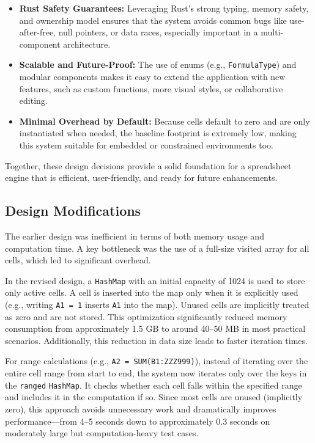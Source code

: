 \documentclass{article}
\begin{document}
\begin{itemize}
    \item \textbf{Rust Safety Guarantees:} Leveraging Rust’s strong typing, memory safety, and ownership model ensures that the system avoids common bugs like use-after-free, null pointers, or data races, especially important in a multi-component architecture.

    \item \textbf{Scalable and Future-Proof:} The use of enums (e.g., \texttt{FormulaType}) and modular components makes it easy to extend the application with new features, such as custom functions, more visual styles, or collaborative editing.

    \item \textbf{Minimal Overhead by Default:} Because cells default to zero and are only instantiated when needed, the baseline footprint is extremely low, making this system suitable for embedded or constrained environments too.
\end{itemize}

Together, these design decisions provide a solid foundation for a spreadsheet engine that is efficient, user-friendly, and ready for future enhancements.

\subsection{Design Modifications}
\label{sec:modifications}

The earlier design was inefficient in terms of both memory usage and computation time. A key bottleneck was the use of a full-size visited array for all cells, which led to significant overhead.

In the revised design, a \texttt{HashMap} with an initial capacity of 1024 is used to store only active cells. A cell is inserted into the map only when it is explicitly used (e.g., writing \texttt{A1 = 1} inserts \texttt{A1} into the map). Unused cells are implicitly treated as zero and are not stored. This optimization significantly reduced memory consumption from approximately 1.5 GB to around 40--50 MB in most practical scenarios. Additionally, this reduction in data size leads to faster iteration times.

For range calculations (e.g., \texttt{A2 = SUM(B1:ZZZ999)}), instead of iterating over the entire cell range from start to end, the system now iterates only over the keys in the \texttt{ranged} \texttt{HashMap}. It checks whether each cell falls within the specified range and includes it in the computation if so. Since most cells are unused (implicitly zero), this approach avoids unnecessary work and dramatically improves performance—from 4--5 seconds down to approximately 0.3 seconds on moderately large but computation-heavy test cases.
\end{document}
